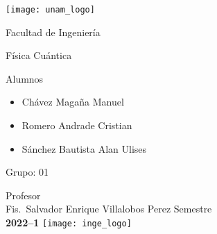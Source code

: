 \begin{titlepage}
  \centering
    \texttt{[image: unam\_logo]}\vspace{0.5cm}

    {\scshape{\Huge Facultad de Ingeniería\par{}}}\vspace{0.25cm}

    {\scshape{\Large Física Cuántica\par{}}}\vfill{}


    {\huge \textbf{\tituloTrabajo{}}}\vfill{}


    {\Large
      Alumnos
      \begin{itemize}
        \item Chávez Magaña Manuel
        \item Romero Andrade Cristian
        \item Sánchez Bautista Alan Ulises
      \end{itemize}
    }\vfill{}

      {\large Grupo: 01\par{}}\vfill{}

    {\large Profesor\\Fis.~Salvador Enrique Villalobos Perez}\vfill{}
    \vfil{}
    {\large Semestre\\\textbf{2022--1}}
    \vfill{}
    \texttt{[image: inge\_logo]}

\end{titlepage}

